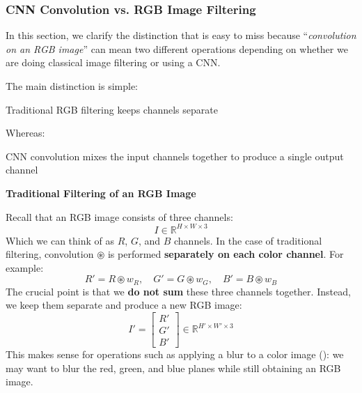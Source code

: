 \subsubsection{CNN Convolution vs. RGB Image Filtering}\label{sec:cnn-convolution-vs-rgb-image-filtering}

In this section, we clarify the distinction that is easy to miss because ``\emph{convolution on an RGB image}'' can mean two different operations depending on whether we are doing classical image filtering or using a CNN.

\highspace
The main distinction is simple:
\begin{center}
    Traditional RGB filtering keeps channels separate
\end{center}
Whereas:
\begin{center}
    CNN convolution mixes the input channels together to produce a single output channel
\end{center}

\highspace
\begin{flushleft}
    \textcolor{Green3}{ \textbf{Traditional Filtering of an RGB Image}}
\end{flushleft}
Recall that an RGB image consists of three channels:
\begin{equation*}
    I \in \mathbb{R}^{H \times W \times 3}
\end{equation*}
Which we can think of as $R$, $G$, and $B$ channels. In the case of traditional filtering, convolution $\circledast$ is performed \textbf{separately on each color channel}. For example:
\begin{equation*}
    R' = R \circledast w_R, \quad G' = G \circledast w_G, \quad B' = B \circledast w_B
\end{equation*}
The crucial point is that we \textbf{do not sum} these three channels together. Instead, we keep them separate and produce a new RGB image:
\begin{equation*}
    I' = \begin{bmatrix} R' \\ G' \\ B' \end{bmatrix} \in \mathbb{R}^{H' \times W' \times 3}
\end{equation*}
This makes sense for operations such as applying a blur to a color image (): we may want to blur the red, green, and blue planes while still obtaining an RGB image.

